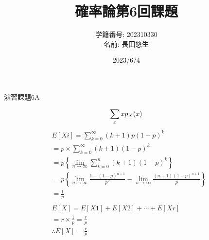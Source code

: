 \documentclass[dvipdfmx,uplatex]{jsarticle}
\title{確率論第6回課題}
\author{
    学籍番号: 202310330\\
    名前: 長田悠生
    }
\date{2023/6/4}
\begin{document}
  \begin{titlepage}
    \maketitle
    \begin{center}
      \textmc{\HUGE \LaTeX}
    \end{center}
    \thispagestyle{empty}
  \end{titlepage}

  \centerline{\huge 演習課題6A}
  \vspace{10mm}
  \begin{equation}
    \sum_{x} x{p}_{X}(x)\nonumber\\
  \end{equation}
  \begin{equation}
    \begin{aligned}
        &E[Xi] = \sum_{k=0}^\infty (k+1)p(1-p)^k\nonumber\\
        &=p \times \sum_{k=0}^\infty (k+1)(1-p)^k\nonumber\\
        &=p \left\{ \lim_{n \to \infty} \sum_{k=0}^n (k+1)(1-p)^k \right\}\nonumber\\
        &=p \left\{ \lim_{n \to \infty} \frac{1-(1-p)^{n+1}}{p^2} -\lim_{n \to \infty} \frac{(n+1)(1-p)^{n+1}}{p} \right\}\nonumber\\
        &= \frac{1}{p}\nonumber\\
        \\
        &E[X]=E[X1] + E[X2] + \cdots + E[Xr]\nonumber\\
        &=r \times \frac{1}{p} = \frac{r}{p}\nonumber\\
        &\therefore E[X]=\frac{r}{p}\nonumber\\
    \end{aligned}
  \end{equation}
\end{document}
